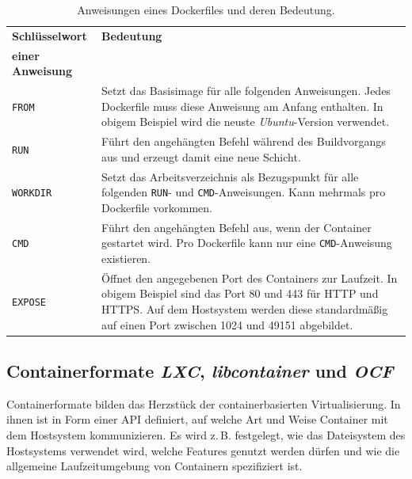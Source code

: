 \documentclass[../main.tex]{subfiles}
\begin{document}
			\vspace{0.5cm}
			\begin{table}[htp]
				\begin{centering}
				\begin{tabularx}{\textwidth}{>{\hsize=0.5\hsize}X|>{\hsize=1\hsize}X}
					\hline
					\textbf{Schlüsselwort} & \textbf{Bedeutung} \\
					\textbf{einer Anweisung} & \\
					\hline
					\texttt{FROM}
					& Setzt das Basisimage für alle folgenden Anweisungen. Jedes Dockerfile muss diese Anweisung am Anfang enthalten. In obigem Beispiel wird die neuste \emph{Ubuntu}-Version verwendet. \\
					\hline
					\texttt{RUN}
					& Führt den angehängten Befehl während des \gls{Build}vorgangs aus und erzeugt damit eine neue Schicht. \\
					\hline
					\texttt{WORKDIR}
					& Setzt das Arbeitsverzeichnis als Bezugspunkt für alle folgenden \texttt{RUN}- und \texttt{CMD}-Anweisungen. Kann mehrmals pro Dockerfile vorkommen. \\
					\hline
					\texttt{CMD}
					& Führt den angehängten Befehl aus, wenn der Container gestartet wird. Pro Dockerfile kann nur eine \texttt{CMD}-Anweisung existieren. \\
					\hline
					\texttt{EXPOSE}
					& Öffnet den angegebenen Port des Containers zur Laufzeit. In obigem Beispiel sind das Port 80 und 443 für \acrshort{HTTP} und \acrshort{HTTPS}. Auf dem Hostsystem werden diese standardmäßig auf einen Port zwischen 1024 und 49151 abgebildet. \\
					\hline
				\end{tabularx}
				\vspace{0.5cm}
				\caption{Anweisungen eines Dockerfiles und deren Bedeutung.}
				\label{tab:dockerfile}
				\end{centering}
			\end{table}



		\subsection{Containerformate \emph{\acrshort{LXC}}, \emph{libcontainer} und \emph{\acrshort{OCF}}}
		\label{dockerContainerformate}
			Containerformate bilden das Herzstück der containerbasierten Virtualisierung. In ihnen ist in Form einer \acrshort{API} definiert, auf welche Art und Weise Container mit dem Hostsystem kommunizieren. Es wird z.\,B. festgelegt, wie das Dateisystem des Hostsystems verwendet wird, welche Features genutzt werden dürfen und wie die allgemeine Laufzeitumgebung von Containern spezifiziert ist.
\end{document}

